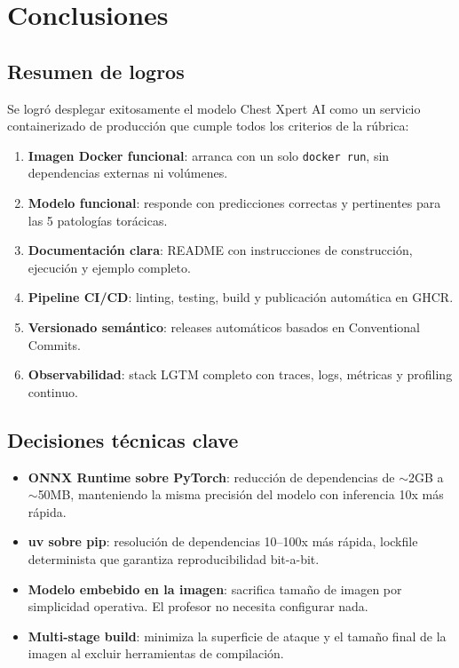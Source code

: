 \section{Conclusiones}
\label{sec:conclusions}

\subsection{Resumen de logros}

Se logr\'o desplegar exitosamente el modelo Chest Xpert AI como un servicio containerizado de producci\'on que cumple todos los criterios de la r\'ubrica:

\begin{enumerate}
    \item \textbf{Imagen Docker funcional}: arranca con un solo \texttt{docker run}, sin dependencias externas ni vol\'umenes.
    \item \textbf{Modelo funcional}: responde con predicciones correctas y pertinentes para las 5 patolog\'ias tor\'acicas.
    \item \textbf{Documentaci\'on clara}: README con instrucciones de construcci\'on, ejecuci\'on y ejemplo completo.
    \item \textbf{Pipeline CI/CD}: linting, testing, build y publicaci\'on autom\'atica en GHCR.
    \item \textbf{Versionado sem\'antico}: releases autom\'aticos basados en Conventional Commits.
    \item \textbf{Observabilidad}: stack LGTM completo con traces, logs, m\'etricas y profiling continuo.
\end{enumerate}

\subsection{Decisiones t\'ecnicas clave}

\begin{itemize}
    \item \textbf{ONNX Runtime sobre PyTorch}: reducci\'on de dependencias de $\sim$2GB a $\sim$50MB, manteniendo la misma precisi\'on del modelo con inferencia 10x m\'as r\'apida.
    \item \textbf{uv sobre pip}: resoluci\'on de dependencias 10--100x m\'as r\'apida, lockfile determinista que garantiza reproducibilidad bit-a-bit.
    \item \textbf{Modelo embebido en la imagen}: sacrifica tama\~no de imagen por simplicidad operativa. El profesor no necesita configurar nada.
    \item \textbf{Multi-stage build}: minimiza la superficie de ataque y el tama\~no final de la imagen al excluir herramientas de compilaci\'on.
\end{itemize}

